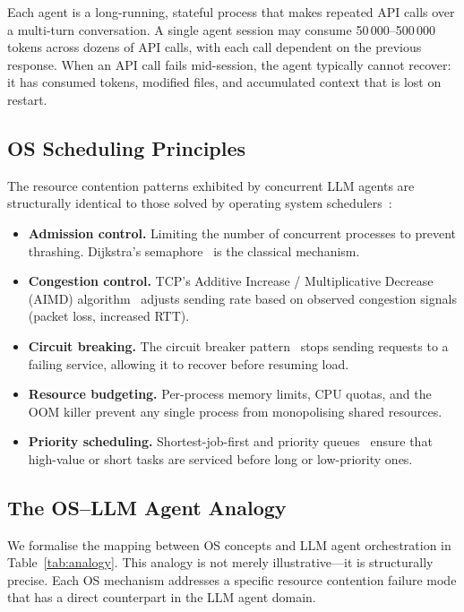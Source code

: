 \documentclass[11pt,twocolumn]{article}
\begin{document}
Each agent is a long-running, stateful process that makes
repeated API calls over a multi-turn conversation.  A single
agent session may consume 50\,000--500\,000 tokens across
dozens of API calls, with each call dependent on the previous
response.  When an API call fails mid-session, the agent
typically cannot recover: it has consumed tokens, modified
files, and accumulated context that is lost on restart.

\subsection{OS Scheduling Principles}

The resource contention patterns exhibited by concurrent LLM
agents are structurally identical to those solved by operating
system schedulers~\cite{silberschatz2018os,tanenbaum2015os}:

\begin{itemize}[nosep]
  \item \textbf{Admission control.}  Limiting the number of
    concurrent processes to prevent thrashing.  Dijkstra's
    semaphore~\cite{dijkstra1965cooperating} is the classical
    mechanism.
  \item \textbf{Congestion control.}  TCP's Additive Increase /
    Multiplicative Decrease (AIMD) algorithm~\cite{jacobson1988congestion,chiu1989aimd}
    adjusts sending rate based on observed congestion signals
    (packet loss, increased RTT).
  \item \textbf{Circuit breaking.}  The circuit breaker
    pattern~\cite{nygard2018release} stops sending requests to a
    failing service, allowing it to recover before resuming load.
  \item \textbf{Resource budgeting.}  Per-process memory limits,
    CPU quotas, and the OOM killer prevent any single process
    from monopolising shared resources.
  \item \textbf{Priority scheduling.}  Shortest-job-first and
    priority queues~\cite{silberschatz2018os} ensure that
    high-value or short tasks are serviced before long or
    low-priority ones.
\end{itemize}

\subsection{The OS--LLM Agent Analogy}

We formalise the mapping between OS concepts and LLM agent
orchestration in Table~\ref{tab:analogy}.  This analogy is not
merely illustrative---it is structurally precise.  Each OS
mechanism addresses a specific resource contention failure mode
that has a direct counterpart in the LLM agent domain.
\end{document}

